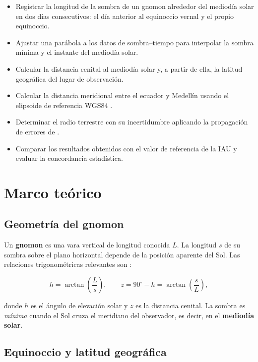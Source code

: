 \begin{itemize}
  \item Registrar la longitud de la sombra de un gnomon alrededor del
        mediodía solar en dos días consecutivos: el día anterior al
        equinoccio vernal y el propio equinoccio.
  \item Ajustar una parábola a los datos de sombra--tiempo para interpolar
        la sombra mínima y el instante del mediodía solar.
  \item Calcular la distancia cenital al mediodía solar y, a partir de
        ella, la latitud geográfica del lugar de observación.
  \item Calcular la distancia meridional entre el ecuador y Medellín
        usando el elipsoide de referencia WGS84 \citep{NGA2014}.
  \item Determinar el radio terrestre con su incertidumbre aplicando la
        propagación de errores de \citet{Baird1991}.
  \item Comparar los resultados obtenidos con el valor de referencia de
        la IAU y evaluar la concordancia estadística.
\end{itemize}

\section{Marco teórico}

\subsection{Geometría del gnomon}

Un \textbf{gnomon} es una vara vertical de longitud conocida $L$.
La longitud $s$ de su sombra sobre el plano horizontal depende de la
posición aparente del Sol.
Las relaciones trigonométricas relevantes son
\citep{PortillaBarbosa2009}:

\begin{equation}
  h = \arctan\!\left(\frac{L}{s}\right), \qquad
  z = 90^\circ - h = \arctan\!\left(\frac{s}{L}\right),
  \label{eq:angulos}
\end{equation}

donde $h$ es el ángulo de elevación solar y $z$ es la distancia
cenital.
La sombra es \emph{mínima} cuando el Sol cruza el meridiano del
observador, es decir, en el \textbf{mediodía solar}.

\subsection{Equinoccio y latitud geográfica}

